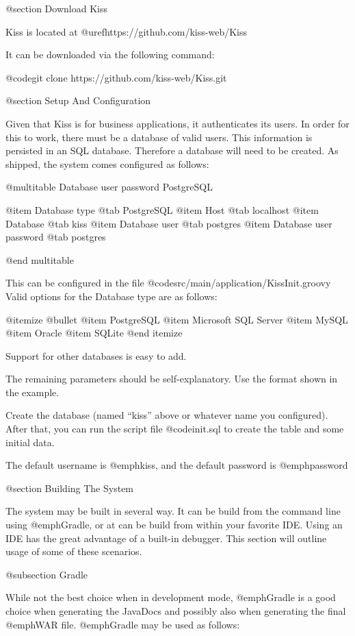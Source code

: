 @section Download Kiss


Kiss is located at @uref{https://github.com/kiss-web/Kiss}

It can be downloaded via the following command:

@code{git clone https://github.com/kiss-web/Kiss.git}

@section Setup And Configuration


Given that Kiss is for business applications, it authenticates its
users.  In order for this to work, there must be a database of valid
users.  This information is persisted in an SQL database.  Therefore a
database will need to be created.  As shipped, the system comes
configured as follows:

@multitable {Database user password} {PostgreSQL} 

@item Database type
@tab PostgreSQL
@item Host
@tab localhost
@item Database
@tab kiss
@item Database user
@tab postgres
@item Database user password
@tab postgres

@end multitable

This can be configured in the file @code{src/main/application/KissInit.groovy}
Valid options for the Database type are as follows:

@itemize @bullet
@item
PostgreSQL
@item
Microsoft SQL Server
@item
MySQL
@item
Oracle
@item
SQLite
@end itemize

Support for other databases is easy to add.

The remaining parameters should be self-explanatory.  Use the format shown in the example.

Create the database (named ``kiss'' above or whatever name you
configured).  After that, you can run the script file @code{init.sql}
to create the table and some initial data.

The default username is @emph{kiss}, and the default password is @emph{password}

@section Building The System

The system may be built in several way.  It can be build from the
command line using @emph{Gradle}, or at can be build from within your
favorite IDE.  Using an IDE has the great advantage of a built-in
debugger.  This section will outline usage of some of these scenarios.

@subsection Gradle 

While not the best choice when in development mode, @emph{Gradle} is a
good choice when generating the JavaDocs and possibly also when
generating the final @emph{WAR} file.  @emph{Gradle} may be used as follows:

